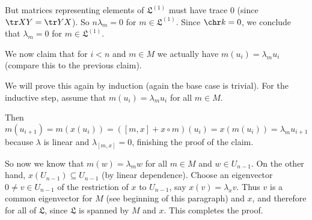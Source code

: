 But matrices representing elements of $\mathfrak{L}^{(1)}$ must have trace $0$
(since $\tr XY = \tr YX$). So $n\lambda_m = 0$ for $m \in \mathfrak{L}^{(1)}$.
Since $\chr k = 0$, we conclude that $\lambda_m = 0$ for $m \in \mathfrak{L}^{(1)}$.

We now claim that for $i < n$ and $m \in M$ we actually have $m(u_i) = \lambda_m u_i$
(compare this to the previous claim).

We will prove this again by induction (again the base case is trivial). For the
inductive step, assume that $m(u_i) = \lambda_m u_i$ for all $m \in M$.

Then \[m(u_{i+1}) = m(x(u_i)) = ([m, x] + x \circ m)(u_i) = x(m(u_i)) = \lambda_m u_{i+1} \]
because $\lambda$ is linear and $\lambda_{[m, x]} = 0$, finishing the proof of the
claim.

So now we know that $m(w) = \lambda_mw$ for all $m \in M$ and $w \in U_{n-1}$.
On the other hand, $x(U_{n-1}) \subseteq U_{n-1}$ (by linear dependence). Choose an
eigenvector $0\neq v \in U_{n-1}$ of the restriction of $x$ to $U_{n-1}$, say
$x(v) = \lambda_x v$. Thus $v$ is a common eigenvector for $M$ (see beginning
of this paragraph) and $x$, and therefore for all of  $\mathfrak{L}$, since $\mathfrak{L}$
is spanned by $M$ and $x$. This completes the proof.
